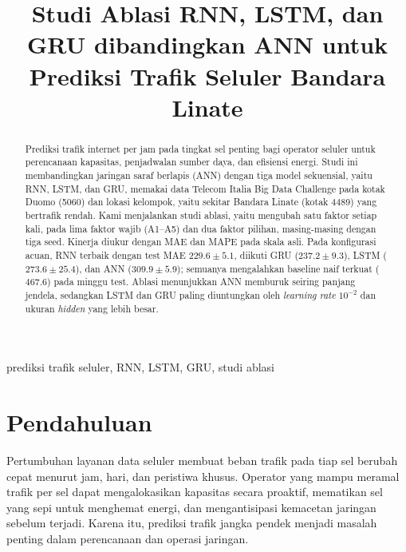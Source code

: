 \documentclass[conference,a4paper]{IEEEtran}
\begin{document}
 
\title{Studi Ablasi RNN, LSTM, dan GRU dibandingkan ANN untuk Prediksi Trafik Seluler Bandara Linate}
 
\author{
\and
{}
\and
{}
}
 
\maketitle
 
\begin{abstract}
Prediksi trafik internet per jam pada tingkat sel penting bagi operator seluler untuk perencanaan kapasitas, penjadwalan sumber daya, dan efisiensi energi. Studi ini membandingkan jaringan saraf berlapis (ANN) dengan tiga model sekuensial, yaitu RNN, LSTM, dan GRU, memakai data Telecom Italia Big Data Challenge pada kotak Duomo (5060) dan lokasi kelompok, yaitu sekitar Bandara Linate (kotak 4489) yang bertrafik rendah. Kami menjalankan studi ablasi, yaitu mengubah satu faktor setiap kali, pada lima faktor wajib (A1--A5) dan dua faktor pilihan, masing-masing dengan tiga seed. Kinerja diukur dengan MAE dan MAPE pada skala asli. Pada konfigurasi acuan, RNN terbaik dengan test MAE $229.6\pm5.1$, diikuti GRU ($237.2\pm9.3$), LSTM ($273.6\pm25.4$), dan ANN ($309.9\pm5.9$); semuanya mengalahkan baseline naif terkuat ($467.6$) pada minggu test. Ablasi menunjukkan ANN memburuk seiring panjang jendela, sedangkan LSTM dan GRU paling diuntungkan oleh \textit{learning rate} $10^{-2}$ dan ukuran \textit{hidden} yang lebih besar.
\end{abstract}
 
\begin{IEEEkeywords}
prediksi trafik seluler, RNN, LSTM, GRU, studi ablasi
\end{IEEEkeywords}
 
\section{Pendahuluan}
Pertumbuhan layanan data seluler membuat beban trafik pada tiap sel berubah cepat menurut jam, hari, dan peristiwa khusus. Operator yang mampu meramal trafik per sel dapat mengalokasikan kapasitas secara proaktif, mematikan sel yang sepi untuk menghemat energi, dan mengantisipasi kemacetan jaringan sebelum terjadi. Karena itu, prediksi trafik jangka pendek menjadi masalah penting dalam perencanaan dan operasi jaringan.
 
\end{document}
